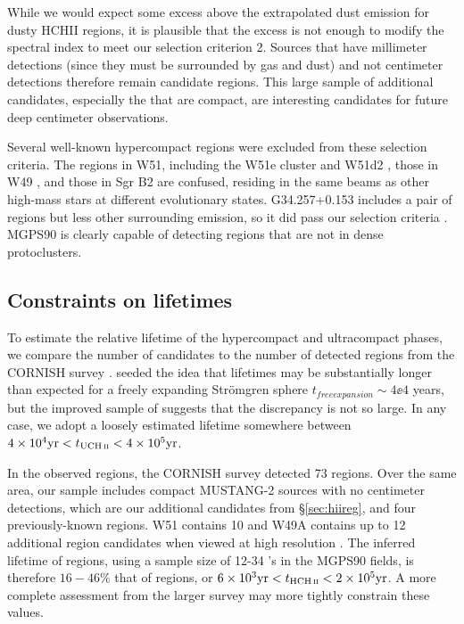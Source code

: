 \documentclass[twocolumn]{aastex62}
\newcommand{\MGPS}{MGPS90\xspace}
\newcommand{\MUSTANG}{MUSTANG-2\xspace}
\begin{document}
While we would expect some excess above the extrapolated dust emission for
dusty HCHII regions, it is plausible that the excess is not enough to modify
the spectral index to meet our selection criterion 2.  Sources that have
millimeter detections (since they must be surrounded by gas and dust) and not
centimeter detections therefore remain candidate \hchii regions.  This large
sample of \mmdetectionscmnondetections additional candidates, especially the
\mmdetectionscmnondetectionscompact that are compact, are interesting
candidates for future deep centimeter observations.

Several well-known hypercompact \hii regions were excluded from these selection
criteria.  The \hchii regions in W51, including the W51e cluster and W51d2
\citep{Ginsburg2016a}, those in W49 \citep{De-Pree1997a}, and those in Sgr B2
\citep{De-Pree1998a} are confused, residing in the same beams as other
high-mass stars at different evolutionary states.  G34.257+0.153 includes a pair
of \hchii regions but less other surrounding emission, so it did pass our selection
criteria \citep{Sewilo2004a,Avalos2006a}.  MGPS90 is clearly capable of detecting
\hchii regions that are not in dense protoclusters.


\subsection{Constraints on \hchii lifetimes}
To estimate the relative lifetime of the hypercompact and ultracompact phases,
we compare the number of \hchii candidates to the number of detected \uchii
regions from the CORNISH survey \citep{Kalcheva2018a}.  \citet{Wood1989a}
seeded the idea that \uchii lifetimes may be substantially longer than expected
for a freely expanding Strömgren sphere $t_{free expansion} \sim 4\ee{4}$ years,
but the improved sample of \citet{Kalcheva2018a} suggests that the discrepancy
is not so large.  In any case, we adopt a loosely estimated \uchii lifetime somewhere
between $4\ee{4} \mathrm{yr} < t_{\uchii} < 4\ee{5} \mathrm{yr}$.

In the observed regions, the CORNISH survey detected 73 \uchii regions.  Over
the same area, our sample includes \mmdetectionscmnondetectionscompact compact
\MUSTANG sources with no centimeter detections, which are our additional
candidates from \S \ref{sec:hiireg}, and four previously-known \hchii regions.
W51 contains 10 and W49A contains up to 12 additional \hchii region candidates
when viewed at high resolution \citep{De-Pree1997a,Ginsburg2016a}.  The
inferred lifetime of \hchii regions, using a sample size of 12-34 \hchii's in
the \MGPS fields, is therefore $16-46\%$ that of \uchii regions, or $6\ee{3}
\mathrm{yr} < t_{\hchii} < 2\ee{5} \mathrm{yr}$.  A more complete assessment
from the larger survey may more tightly constrain these values.
\end{document}
